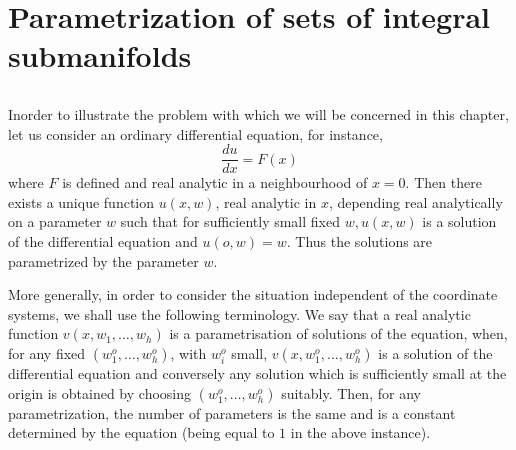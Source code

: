 
\chapter{Parametrization of sets of integral submanifolds}\label{chap1} %

\section{}\label{chap1:sec1.1} %

In\pageoriginale order to illustrate the problem with which we will be concerned in
this chapter, let us consider an ordinary differential equation,  for
instance,  
$$
\frac{du}{dx} = F(x)
$$
where $F$ is defined and real analytic in a neighbourhood of $x =
0$. Then there exists a unique function $u(x,  w)$,  real analytic in
$x$,  depending real analytically on a parameter $w$ such that for
sufficiently small fixed $w,  u(x,  w)$ is a solution of the
differential equation and $u(o,  w) = w$. Thus the solutions are
parametrized by the parameter $w$. 

More generally,  in order to consider the situation independent of the
coordinate systems,  we shall use the following terminology. We say
that a real analytic function $v(x,  w_1,  \ldots,  w_h)$ is a
parametrisation of solutions of the equation,  when,  for any fixed
$(w^o_1, \ldots,  w^o_h)$,  with $w^o_i$ small,  $v(x,  w^o_1,
\ldots,  w^o_h)$ is a solution of the differential equation and
conversely any solution which is sufficiently small at the origin is
obtained by choosing $(w^o_1,  \ldots,  w^o_h)$ suitably. Then,  for
any parametrization,  the number of parameters is the same and is a
constant determined by the equation (being equal to $1$ in the above
instance). 

